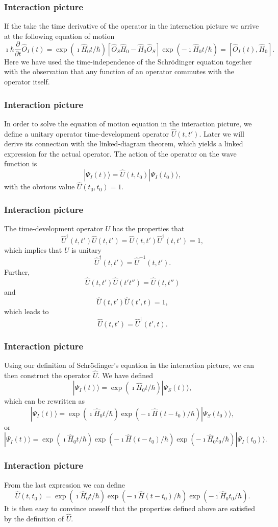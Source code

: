 \documentclass[compress]{beamer}
\begin{document}
\frame
{
\frametitle{Interaction picture}
\begin{small}
{\scriptsize
If the take the time derivative of the operator in the interaction picture we arrive at the following equation of motion
\[
\imath \hbar\frac{\partial }{\partial t}\hat{O}_I(t) = \exp{(\imath\hat{H}_0t/\hbar)}\left[\hat{O}_S\hat{H}_0-\hat{H}_0\hat{O}_S\right]\exp{(-\imath\hat{H}_0t/\hbar)}=\left[\hat{O}_I(t),\hat{H}_0\right].
\]
Here we have used the time-independence of the Schr\"odinger equation
together with the observation that any function of an operator commutes with the operator itself. 
}
\end{small}
}
\frame
{
\frametitle{Interaction picture}
\begin{small}
{\scriptsize
In order to solve the equation of motion equation in the interaction picture, we define a unitary operator
time-development operator $\hat{U}(t,t')$. Later we will derive its
connection with the linked-diagram theorem, which yields a
linked expression for the actual operator. 
The action of the operator on the wave function is
\[
|\Psi_I(t) \rangle = \hat{U}(t,t_0)|\Psi_I(t_0)\rangle,
\]
with the obvious value $\hat{U}(t_0,t_0)=1$.
}
\end{small}
}
\frame
{
\frametitle{Interaction picture}
\begin{small}
{\scriptsize
The time-development operator $U$ has the
properties that
\[
     \hat{U}^{\dagger}(t,t')\hat{U}(t,t')=\hat{U}(t,t')\hat{U}^{\dagger}(t,t')=1,
\]
which implies that $U$ is unitary
\[
     \hat{U}^{\dagger}(t,t')=\hat{U}^{-1}(t,t').
\]
Further,
\[
    \hat{U}(t,t')\hat{U}(t't'')=\hat{U}(t,t'')
\]
and
\[
    \hat{U}(t,t')\hat{U}(t',t)=1,
\]
which leads to
\[
    \hat{U}(t,t')=\hat{U}^{\dagger}(t',t).
\]
}
\end{small}
}
\frame
{
\frametitle{Interaction picture}
\begin{small}
{\scriptsize
Using our definition of Schr\"odinger's equation in the interaction picture, we can then construct the operator $\hat{U}$. We have defined
\[
|\Psi_I(t)\rangle = \exp{(\imath\hat{H}_0t/\hbar)}|\Psi_S(t)\rangle,
\]
which can be rewritten as 
\[
|\Psi_I(t)\rangle = \exp{(\imath\hat{H}_0t/\hbar)}\exp{(-\imath\hat{H}(t-t_0)/\hbar)}|\Psi_S(t_0)\rangle,
\]
or
\[
|\Psi_I(t)\rangle = \exp{(\imath\hat{H}_0t/\hbar)}\exp{(-\imath\hat{H}(t-t_0)/\hbar)}\exp{(-\imath\hat{H}_0t_0/\hbar)}|\Psi_I(t_0)\rangle.
\]
}
\end{small}
}
\frame
{
\frametitle{Interaction picture}
\begin{small}
{\scriptsize
From the last expression we can define
\[
\hat{U}(t,t_0)=\exp{(\imath\hat{H}_0t/\hbar)}\exp{(-\imath\hat{H}(t-t_0)/\hbar)}\exp{(-\imath\hat{H}_0t_0/\hbar)}.
\]
It is then easy to convince oneself that the properties defined above are satisfied by the definition of $\hat{U}$. 
}
\end{small}
}
\end{document}
